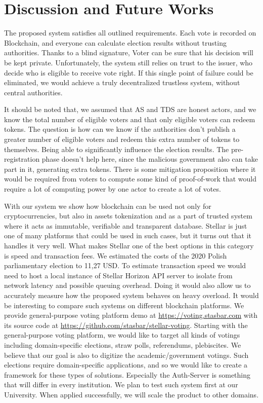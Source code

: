 \documentclass[runningheads]{llncs}
\begin{document}
\section{Discussion and Future Works}


The proposed system satisfies all outlined requirements. Each vote is recorded on Blockchain, and everyone can calculate election results without trusting authorities. Thanks to a blind signature, Voter can be sure that his decision will be kept private. Unfortunately, the system still relies on trust to the issuer, who decide who is eligible to receive vote right. If this single point of failure could be eliminated, we would achieve a truly decentralized trustless system, without central authorities.


It should be noted that, we assumed that AS and TDS are honest actors,
and we know the total number of eligible voters and that only eligible voters can redeem tokens. The question is how can we know if the authorities don't publish a greater number of eligible voters and redeem this extra number of tokens to themselves. Being able to significantly influence the election results. The pre-registration phase doesn't help here, since the malicious government also can take part in it, generating extra tokens. There is some mitigation proposition where it would be required from voters to compute some kind of proof-of-work that would require a lot of computing power by one actor to create a lot of votes.

With our system we show how blockchain can be used not only for cryptocurrencies, but also in assets tokenization and as a part of trusted system where it acts as immutable, verifiable and transparent database. Stellar is just one of many platforms that could be used in such cases, but it turns out that it handles it very well. What makes Stellar one of the best
options in this category is speed and transaction fees. We estimated the costs of the 2020 Polish parliamentary election to 11,27 USD. 
To estimate transaction speed we would need to host a local instance of Stellar Horizon API server to isolate from network latency and possible queuing overhead. Doing it would also allow us to accurately measure how the proposed system behaves on heavy overload. 
It would be interesting to compare such systems on different blockchain platforms. 
We provide general-purpose voting platform demo at \url{https://voting.stasbar.com} with its source code at \url{https://github.com/stasbar/stellar-voting}.
Starting with the general-purpose voting platform, we would like to target all kinds of votings including domain-specific elections, straw polls, referendums, plebiscites. We believe that our goal is also to digitize the academic/government votings. Such elections require domain-specific applications, and so we would like to create a framework for these types of solutions. Especially the Auth-Server is something that will differ in every institution. We plan to test such system first at our University. When applied successfully, we will scale the product to other domains. 




\end{document}
